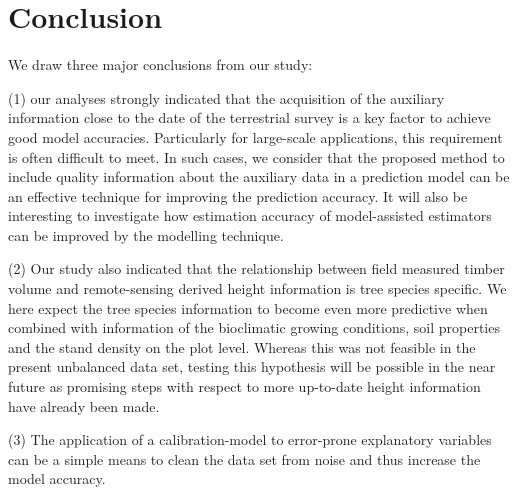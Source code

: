 \section{Conclusion}
\label{sec:concl}

We draw three major conclusions from our study: 

(1) our analyses strongly indicated that the acquisition of the auxiliary information close to the date of the terrestrial survey is a key factor to achieve good model accuracies. Particularly for large-scale applications, this requirement is often difficult to meet. In such cases, we consider that the proposed method to include quality information about the auxiliary data in a prediction model can be an effective technique for improving the prediction accuracy. It will also be interesting to investigate how estimation accuracy of model-assisted estimators can be improved by the modelling technique. 

(2) Our study also indicated that the relationship between field measured timber volume and remote-sensing derived height information is tree species specific. We here expect the tree species information to become even more predictive when combined with information of the bioclimatic growing conditions, soil properties and the stand density on the plot level. Whereas this was not feasible in the present unbalanced data set, testing this hypothesis will be possible in the near future as promising steps with respect to more up-to-date height information have already been made. 

(3) The application of a calibration-model to error-prone explanatory variables can be a simple means to clean the data set from noise and thus increase the model accuracy.\\






%
%

